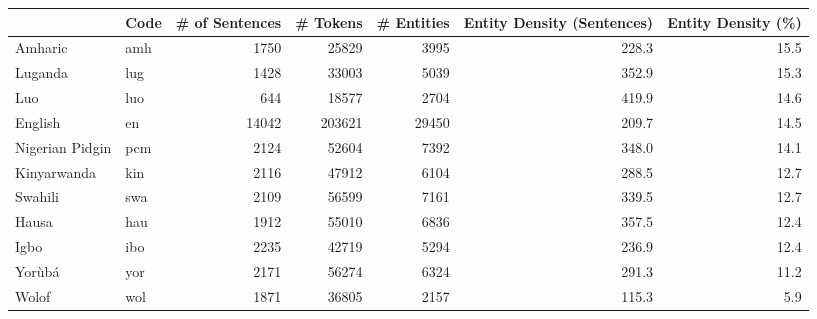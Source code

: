 \begin{tabular}{llrrrrr}
\toprule
{} & Code &  \# of Sentences &  \# Tokens &  \# Entities &  Entity Density (Sentences) &  Entity Density (\%) \\
\midrule
Amharic         &  amh &            1750 &     25829 &        3995 &                       228.3 &                15.5 \\
Luganda         &  lug &            1428 &     33003 &        5039 &                       352.9 &                15.3 \\
Luo             &  luo &             644 &     18577 &        2704 &                       419.9 &                14.6 \\
English         &   en &           14042 &    203621 &       29450 &                       209.7 &                14.5 \\
Nigerian Pidgin &  pcm &            2124 &     52604 &        7392 &                       348.0 &                14.1 \\
Kinyarwanda     &  kin &            2116 &     47912 &        6104 &                       288.5 &                12.7 \\
Swahili         &  swa &            2109 &     56599 &        7161 &                       339.5 &                12.7 \\
Hausa           &  hau &            1912 &     55010 &        6836 &                       357.5 &                12.4 \\
Igbo            &  ibo &            2235 &     42719 &        5294 &                       236.9 &                12.4 \\
Yorùbá          &  yor &            2171 &     56274 &        6324 &                       291.3 &                11.2 \\
Wolof           &  wol &            1871 &     36805 &        2157 &                       115.3 &                 5.9 \\
\bottomrule
\end{tabular}
